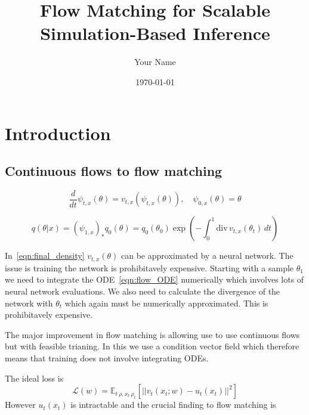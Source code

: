 \documentclass{article}
\title{Flow Matching for Scalable Simulation-Based Inference}
\author{Your Name}
\date{\today}
\begin{document}
\maketitle

\section{Introduction}

\subsection{Continuous flows to flow matching}

\begin{equation}
    \label{eqn:flow_ODE}
    \frac{d}{dt}\psi_{t,x}(\theta) = v_{t,x}(\psi_{t,x}(\theta)), \quad \psi_{0,x}(\theta) = \theta
\end{equation}

\begin{equation}
    \label{eqn:final_density}
q(\theta|x) = (\psi_{1,x})_* q_0(\theta) = q_0(\theta_0) \exp\left(-\int_0^1 \text{div}\, v_{t,x}(\theta_t) \, dt\right)    
\end{equation}

In~\cref{eqn:final_density} $v_{t,x}(\theta)$ can be approximated by a neural network. The issue is training the network is prohibitavely expensive.
Starting with a sample $\theta_1$ we need to integrate the ODE~\cref{eqn:flow_ODE} numerically which involves lots of neural network evaluations. We also need to calculate the divergence of
the network with $\theta_t$ which again must be numerically approximated. This is prohibitavely expensive. 

The major improvement in flow matching is allowing use to use continuous flows but with feasible trianing. In this we use a condition vector field which therefore means that training does not involve
integrating ODEs. 

The ideal loss is 
\begin{equation}
    \label{eqn:ideal_loss}
    \mathcal{L}(w) = \mathbb{E}_{t~\rho, x_t~\rho_t}[||v_t(x_t; w)- u_t(x_t)||^2]
\end{equation}
However $u_t(x_t)$ is intractable and the crucial finding to flow matching is
\end{document}

